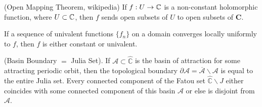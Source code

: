 \begin{thm}
\label{app:thm:openmapping}
(Open Mapping Theorem, wikipedia) If $f : U \rightarrow \mathbb{C}$ is a non-constant holomorphic function, where $U \subset \mathbb{C}$, then $f$ sends open subsets of $U$ to open subsets of $\mathbf{C}$.
\end{thm}


\begin{thm}\label{ax:thm:uniform-limit-univalent}If a sequence of univalent functions $\{f_n\}$ on a domain converges locally uniformly to $f$, then $f$ is either constant or univalent.
\end{thm}


\begin{lem} 
\label{app:lem:julia}
(Basin Boundary \(=\) Julia Set). If \(\mathcal{A} \subset \widehat{\mathbb{C}}\) is the basin of attraction for some attracting periodic orbit, then the topological boundary \(\partial \mathcal{A}=\overline{\mathcal{A}} \backslash \mathcal{A}\) is equal to the entire Julia set. Every connected component of the Fatou set \(\widehat{\mathbb{C}} \backslash J\) either
coincides with some connected component of this basin \(\mathcal{A}\) or else is disjoint from \(\mathcal{A}\). 
\end{lem}

